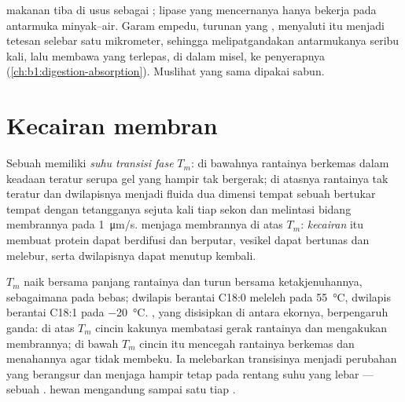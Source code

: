 \begin{example}\label{ex:b1:lipids:bile}
 makanan tiba di usus sebagai ; lipase yang mencernanya
hanya bekerja pada antarmuka minyak--air. Garam empedu, turunan
 yang , menyaluti  itu menjadi tetesan selebar
satu mikrometer, sehingga melipatgandakan antarmukanya seribu kali, lalu
membawa  yang terlepas, di dalam misel, ke  penyerapnya
(\cref{ch:b1:digestion-absorption}). Muslihat yang sama dipakai sabun.
\end{example}

\section{Kecairan membran}

\begin{definition}\label{def:b1:lipids:fluidity}
Sebuah  memiliki \emph{suhu transisi fase}
$T_m$: di bawahnya rantainya berkemas dalam keadaan
teratur serupa gel yang  hampir tak bergerak; di atasnya
rantainya tak teratur dan dwilapisnya menjadi fluida dua dimensi tempat
sebuah  bertukar tempat dengan tetangganya sejuta kali tiap sekon
dan melintasi bidang membrannya pada \qty{1}{\micro m/s}.  menjaga
membrannya di atas $T_m$: \emph{kecairan} itu
membuat protein dapat berdifusi dan berputar, vesikel dapat bertunas
dan melebur, serta dwilapisnya dapat menutup kembali.
\end{definition}

\begin{proposition}\label{prop:b1:lipids:fluidityfactors}
$T_m$ naik bersama panjang rantainya dan turun bersama ketakjenuhannya,
sebagaimana pada  bebas; dwilapis berantai C18:0 meleleh pada
\qty{55}{\celsius}, dwilapis berantai C18:1 pada \qty{-20}{\celsius}.
, yang disisipkan di antara ekornya, berpengaruh ganda: di
atas $T_m$ cincin kakunya membatasi gerak rantainya dan mengakukan
membrannya; di bawah $T_m$ cincin itu mencegah rantainya berkemas dan
menahannya agar tidak membeku. Ia melebarkan transisinya menjadi
perubahan yang berangsur dan menjaga  hampir tetap pada
rentang suhu yang lebar --- sebuah  . 
hewan mengandung sampai satu  tiap .
\end{proposition}

